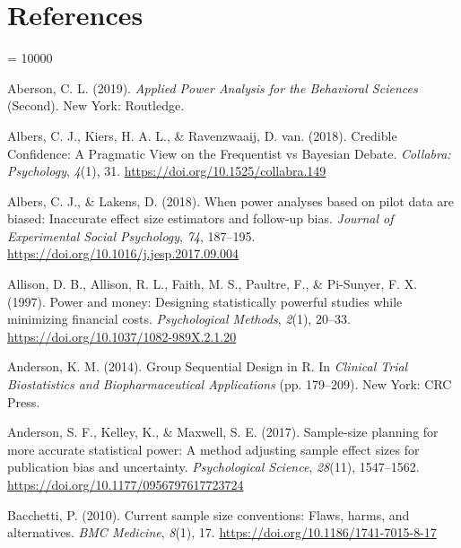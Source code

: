 \documentclass[
  english,
  ,jou, a4paper,floatsintext]{apa6}
\newlength{\cslhangindent}
\newenvironment{cslreferences}%
  {\setlength{\parindent}{0pt}%
  \everypar{\setlength{\hangindent}{\cslhangindent}}\ignorespaces}%
  {\par}
\begin{document}
\hypertarget{references}{%
\section{References}\label{references}}

\begingroup

\interlinepenalty = 10000

\hypertarget{refs}{}
\begin{cslreferences}
\leavevmode\hypertarget{ref-aberson_applied_2019}{}%
Aberson, C. L. (2019). \emph{Applied Power Analysis for the Behavioral Sciences} (Second). New York: Routledge.

\leavevmode\hypertarget{ref-albers_credible_2018}{}%
Albers, C. J., Kiers, H. A. L., \& Ravenzwaaij, D. van. (2018). Credible Confidence: A Pragmatic View on the Frequentist vs Bayesian Debate. \emph{Collabra: Psychology}, \emph{4}(1), 31. \url{https://doi.org/10.1525/collabra.149}

\leavevmode\hypertarget{ref-albers_when_2018}{}%
Albers, C. J., \& Lakens, D. (2018). When power analyses based on pilot data are biased: Inaccurate effect size estimators and follow-up bias. \emph{Journal of Experimental Social Psychology}, \emph{74}, 187--195. \url{https://doi.org/10.1016/j.jesp.2017.09.004}

\leavevmode\hypertarget{ref-allison_power_1997}{}%
Allison, D. B., Allison, R. L., Faith, M. S., Paultre, F., \& Pi-Sunyer, F. X. (1997). Power and money: Designing statistically powerful studies while minimizing financial costs. \emph{Psychological Methods}, \emph{2}(1), 20--33. \url{https://doi.org/10.1037/1082-989X.2.1.20}

\leavevmode\hypertarget{ref-anderson_group_2014}{}%
Anderson, K. M. (2014). Group Sequential Design in R. In \emph{Clinical Trial Biostatistics and Biopharmaceutical Applications} (pp. 179--209). New York: CRC Press.

\leavevmode\hypertarget{ref-anderson_sample-size_2017}{}%
Anderson, S. F., Kelley, K., \& Maxwell, S. E. (2017). Sample-size planning for more accurate statistical power: A method adjusting sample effect sizes for publication bias and uncertainty. \emph{Psychological Science}, \emph{28}(11), 1547--1562. \url{https://doi.org/10.1177/0956797617723724}

\leavevmode\hypertarget{ref-bacchetti_current_2010}{}%
Bacchetti, P. (2010). Current sample size conventions: Flaws, harms, and alternatives. \emph{BMC Medicine}, \emph{8}(1), 17. \url{https://doi.org/10.1186/1741-7015-8-17}


\end{cslreferences}
\end{document}
